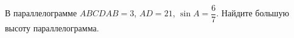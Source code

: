 \begin{ex}
	\begin{condition}
		В параллелограмме \(ABCD AB=3\), \(AD=21\),  \( \sin A=\dfrac{6}{7} \).  Найдите большую высоту параллелограмма.
	\end{condition}
\end{ex}